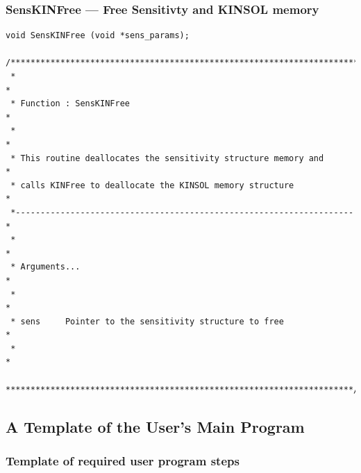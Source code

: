 \documentclass[11pt]{article}
\begin{document}
\subsubsection{SensKINFree --- Free Sensitivty and KINSOL memory}
\small
\begin{verbatim}
void SensKINFree (void *sens_params);

/**********************************************************************
 *                                                                    *
 * Function : SensKINFree                                             *
 *                                                                    *
 * This routine deallocates the sensitivity structure memory and      *
 * calls KINFree to deallocate the KINSOL memory structure            *
 *--------------------------------------------------------------------*
 *                                                                    *
 * Arguments...                                                       *
 *                                                                    *
 * sens     Pointer to the sensitivity structure to free              *
 *                                                                    *
 **********************************************************************/
\end{verbatim}
\normalsize

\subsection{A Template of the User's Main Program}
\subsubsection{Template of required user program steps}
\end{document}
